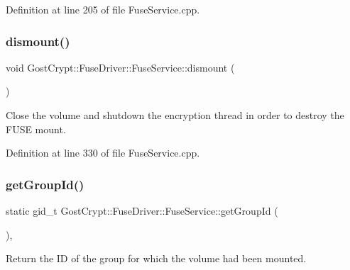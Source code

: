 Definition at line 205 of file Fuse\+Service.\+cpp.

\mbox{\label{class_gost_crypt_1_1_fuse_driver_1_1_fuse_service_ab5026717d04c3ecd8d0e32a8deb81589}} 
\subsubsection{\texorpdfstring{dismount()}{dismount()}}
{\footnotesize\ttfamily void Gost\+Crypt\+::\+Fuse\+Driver\+::\+Fuse\+Service\+::dismount (\begin{DoxyParamCaption}{ }\end{DoxyParamCaption})\hspace{0.3cm}{\ttfamily [static]}}



Close the volume and shutdown the encryption thread in order to destroy the F\+U\+SE mount. 



Definition at line 330 of file Fuse\+Service.\+cpp.

\mbox{\label{class_gost_crypt_1_1_fuse_driver_1_1_fuse_service_a695ae71bede89ec373e3e04bf60e9c8e}} 
\subsubsection{\texorpdfstring{get\+Group\+Id()}{getGroupId()}}
{\footnotesize\ttfamily static gid\+\_\+t Gost\+Crypt\+::\+Fuse\+Driver\+::\+Fuse\+Service\+::get\+Group\+Id (\begin{DoxyParamCaption}{ }\end{DoxyParamCaption})\hspace{0.3cm}{\ttfamily [inline]}, {\ttfamily [static]}}



Return the ID of the group for which the volume had been mounted. 

